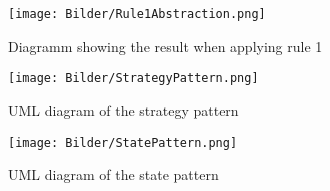 
\begin{figure}
\centering
\texttt{[image: Bilder/Rule1Abstraction.png]}
\caption[Diagramm showing the result when applying rule 1]{Diagramm showing the result when applying rule 1}
\label{picture:rule1abstraction}
\end{figure}


\begin{figure}
\centering
\texttt{[image: Bilder/StrategyPattern.png]}
\caption[\acf{UML} diagram of the strategy pattern]{\acf{UML} diagram of the strategy pattern}
\label{picture:strategypattern}
\end{figure}


\begin{figure}
\centering
\texttt{[image: Bilder/StatePattern.png]}
\caption[\acf{UML} diagram of the state pattern]{\acf{UML} diagram of the state pattern}
\label{picture:statepattern}
\end{figure}